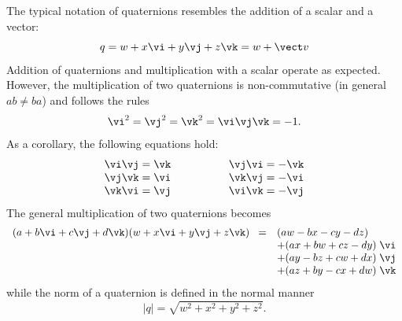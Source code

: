 The typical notation of quaternions resembles the addition of a scalar
and a vector:
%
\begin{equation}
q = w + x\vi + y\vj + z\vk = w + \vect v
\end{equation}
%
Addition of quaternions and multiplication with a scalar operate as
expected.  However, the multiplication of two quaternions is
non-commutative (in general $ab \neq ba$) and follows the rules
%
\begin{equation}
\vi^2 = \vj^2 = \vk^2 = \vi\vj\vk = -1.
\end{equation}
%
As a corollary, the following equations hold:
%
\begin{equation}
\begin{array}{rl}
\vi\vj = \vk  \hspace{15mm}& \vj\vi = -\vk \\
\vj\vk = \vi  \hspace{15mm}& \vk\vj = -\vi \\
\vk\vi = \vj  \hspace{15mm}& \vi\vk = -\vj 
\end{array}
\end{equation}
%
The general multiplication of two quaternions becomes
%
\begin{equation}
\begin{array}{rl}
(a + b\vi + c\vj + d\vk)(w + x\vi + y\vj + z\vk)\;\; =
 &   (aw-bx-cy-dz) \\
 & + (ax+bw+cz-dy)\;\vi \\
 & + (ay-bz+cw+dx)\;\vj \\
 & + (az+by-cx+dw)\;\vk
\end{array}
\end{equation}
%
while the norm of a quaternion is defined in the normal manner
%
\begin{equation}
|q| = \sqrt{w^2+x^2+y^2+z^2}.
\end{equation}


